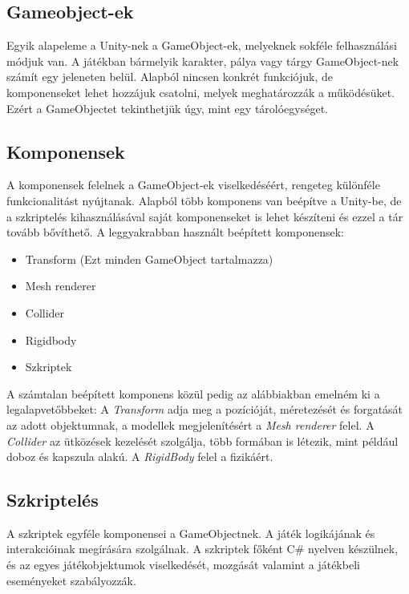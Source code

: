 \documentclass[
]{thesis-ekf}
\theoremstyle{definition}
\theoremstyle{remark}
\begin{document}
\subsection{Gameobject-ek}

Egyik alapeleme a Unity-nek a GameObject-ek\cite{GameObject}, melyeknek sokféle felhasználási módjuk van. A játékban bármelyik karakter, pálya vagy tárgy GameObject-nek számít egy jeleneten belül. Alapból nincsen konkrét funkciójuk, de komponenseket lehet hozzájuk csatolni, melyek meghatározzák a működésüket. Ezért a GameObjectet tekinthetjük úgy, mint egy tárolóegységet.

\subsection{Komponensek}

A komponensek\cite{components} felelnek a GameObject-ek viselkedéséért, rengeteg különféle funkcionalitást nyújtanak. Alapból több komponens van beépítve a Unity-be, de a szkriptelés kihasználásával saját komponenseket is lehet készíteni és ezzel a tár tovább bővíthető. A leggyakrabban használt beépített komponensek:
\begin{itemize}
 \item Transform\cite{transform} (Ezt minden GameObject tartalmazza)
 \item Mesh renderer\cite{meshrenderer}
 \item Collider\cite{collider}
 \item Rigidbody\cite{rigidbody}
 \item Szkriptek\cite{scripting}
\end{itemize}

A számtalan beépített komponens közül pedig az alábbiakban emelném ki a legalapvetőbbeket:
A \emph{Transform} adja meg a pozícióját, méretezését és forgatását az adott objektumnak, a modellek megjelenítésért a \emph{Mesh renderer} felel. A \emph{Collider} az ütközések kezelését szolgálja, több formában is létezik, mint például doboz és kapszula alakú. A \emph{RigidBody} felel a fizikáért.

\subsection{Szkriptelés}

A szkriptek egyféle komponensei a GameObjectnek. A játék logikájának és interakcióinak megírására szolgálnak. A szkriptek főként C\# nyelven készülnek, és az egyes játékobjektumok viselkedését, mozgását valamint a játékbeli eseményeket szabályozzák.
\end{document}
